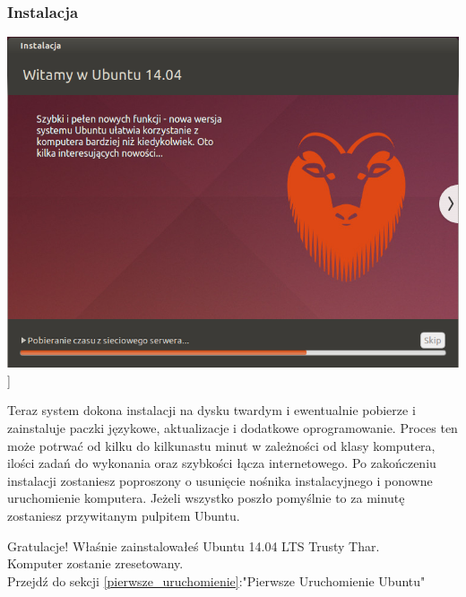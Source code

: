 \subsubsection{Instalacja}
\begin{center}
        \includegraphics[width=\linewidth]{images/instalator_kopiowanie.png}]
\end{center}

Teraz system dokona instalacji na dysku twardym i ewentualnie pobierze i zainstaluje paczki językowe, aktualizacje i dodatkowe oprogramowanie. Proces ten może potrwać od kilku do kilkunastu minut w zależności od klasy komputera, ilości zadań do wykonania oraz szybkości łącza internetowego.
Po zakończeniu instalacji zostaniesz poproszony o usunięcie nośnika instalacyjnego i ponowne uruchomienie komputera. Jeżeli wszystko poszło pomyślnie to za minutę zostaniesz przywitanym pulpitem Ubuntu.
\begin{flushright}
\textcolor{ubuntu_orange}{Gratulacje!} Właśnie zainstalowałeś Ubuntu 14.04 LTS Trusty Thar.\\
Komputer zostanie zresetowany.\\
Przejdź do sekcji \ref{pierwsze_uruchomienie}:"Pierwsze Uruchomienie Ubuntu"
\end{flushright}
\clearpage

